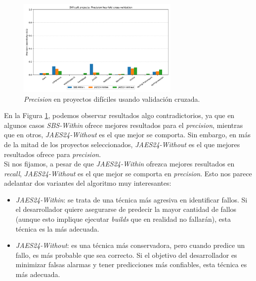 \begin{figure}[H]
    \centering
    \includegraphics[width=0.7\textwidth]{images/Difficult projects: Precision key-fold cross validation.pdf}
    \caption{\textit{Precision} en proyectos difíciles usando validación cruzada.}
    \label{fig:key-fold_precision_difficult_projects}
\end{figure}

En la Figura \ref{fig:key-fold_precision_difficult_projects}, podemos observar resultados algo
contradictorios, ya que en algunos casos \textit{SBS-Within} ofrece mejores resultados para
el \textit{precision}, mientras que en otros, \textit{JAES24-Without} es el que mejor se comporta.
Sin embargo, en más de la mitad de los proyectos seleccionados, \textit{JAES24-Without} es el que
mejores resultados ofrece para \textit{precision}.\\

Si nos fijamos, a pesar de que \textit{JAES24-Within} ofrezca mejores resultados en \textit{recall},
\textit{JAES24-Without} es el que mejor se comporta en \textit{precision}. Esto nos parece
adelantar dos variantes del algoritmo muy interesantes:

\begin{itemize}
    \item \textit{JAES24-Within}: se trata de una técnica más agresiva en identificar fallos. Si
    el desarrollador quiere asegurarse de predecir la mayor cantidad de fallos (aunque esto
    implique ejecutar \textit{builds} que en realidad no fallarán), esta técnica es la más
    adecuada.\\

    \item \textit{JAES24-Without}: es una técnica más conservadora, pero cuando predice un fallo,
    es más probable que sea correcto. Si el objetivo del desarrollador es minimizar falsas
    alarmas y tener predicciones más confiables, esta técnica es más adecuada.
\end{itemize}

